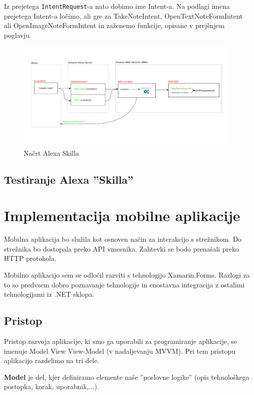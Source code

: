 \documentclass[a4paper, 12pt]{book}
\begin{document}
Iz prejetega \texttt{IntentRequest}-a nato dobimo ime Intent-a.
Na podlagi imena prejetega Intent-a ločimo, ali gre za TakeNoteIntent, OpenTextNoteFormIntent ali OpenImageNoteFormIntent in zaženemo funkcije, opisane v prejšnjem poglavju.


\begin{figure}[H]
\begin{center}
\includegraphics[width=11cm]{skill}
\end{center}
\caption{Načrt Alexa Skilla}
\label{skill}
\end{figure}


\subsection{Testiranje Alexa ''Skilla''}

\section{Implementacija mobilne aplikacije}

Mobilna aplikacija bo služila kot osnoven način za interakcijo s strežnikom.
Do strežnika bo dostopala preko API vmesnika.
Zahtevki se bodo prenašali preko HTTP protokola.

Mobilno aplikacijo sem se odločil razviti s tehnologijo Xamarin.Forms.
Razlogi za to so predvsem dobro poznavanje tehnologije in enostavna integracija z ostalimi tehnologijami iz .NET sklopa.


\subsection{Pristop}
Pristop razvoja aplikacije, ki smo ga uporabili za programiranje aplikacije, se imenuje Model View View-Model (v nadaljevanju MVVM).
Pri tem pristopu aplikacijo razdelimo na tri dele.

\textbf{Model} je del, kjer definiramo elemente naše ''poslovne logike'' (opis tehnološkega postopka, korak, uporabnik,...).
\end{document}
